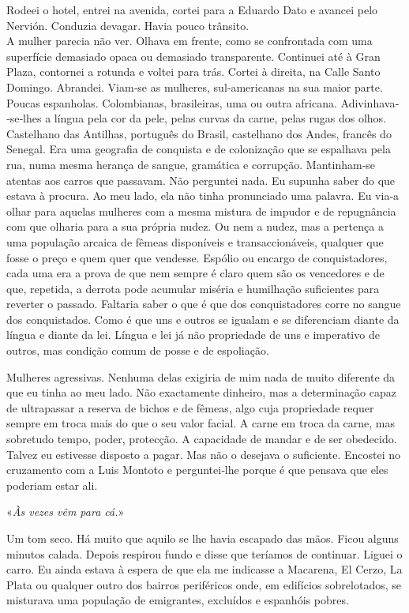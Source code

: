 Rodeei o hotel, entrei na avenida, cortei para a Eduardo Dato e avancei
pelo Nervión. Conduzia devagar. Havia pouco trânsito.\\
A mulher parecia não ver. Olhava em frente, como se confrontada com uma
superfície demasiado opaca ou demasiado transparente. Continuei até à
Gran Plaza, contornei a rotunda e voltei para trás. Cortei à direita, na
Calle Santo Domingo. Abrandei. Viam­‑se as mulheres, sul­‑americanas na
sua maior parte. Poucas espanholas. Colombianas, brasileiras, uma ou
outra africana. Adivinhava­‑se­‑lhes a língua pela cor da pele, pelas
curvas da carne, pelas rugas dos olhos. Castelhano das Antilhas,
português do Brasil, castelhano dos Andes, francês do Senegal. Era uma
geografia de conquista e de colonização que se espalhava pela rua, numa
mesma herança de sangue, gramática e corrupção. Mantinham­‑se atentas
aos carros que passavam. Não perguntei nada. Eu supunha saber do que
estava à procura. Ao meu lado, ela não tinha pronunciado uma palavra. Eu
via­‑a olhar para aquelas mulheres com a mesma mistura de impudor e de
repugnância com que olharia para a sua própria nudez. Ou nem a nudez,
mas a pertença a uma população arcaica de fêmeas disponíveis e
transaccionáveis, qualquer que fosse o preço e quem quer que vendesse.
Espólio ou encargo de conquistadores, cada uma era a prova de que nem
sempre é claro quem são os vencedores e de que, repetida, a derrota pode
acumular miséria e humilhação suficientes para reverter o passado.
Faltaria saber o que é que dos conquistadores corre no sangue dos
conquistados. Como é que uns e outros se igualam e se diferenciam diante
da língua e diante da lei. Língua e lei já não propriedade de uns e
imperativo de outros, mas condição comum de posse e de espoliação.

Mulheres agressivas. Nenhuma delas exigiria de mim nada de muito
diferente da que eu tinha ao meu lado. Não exactamente dinheiro, mas a
determinação capaz de ultrapassar a reserva de bichos e de fêmeas, algo
cuja propriedade requer sempre em troca mais do que o seu valor facial.
A carne em troca da carne, mas sobretudo tempo, poder, protecção. A
capacidade de mandar e de ser obedecido. Talvez eu estivesse disposto a
pagar. Mas não o desejava o suficiente. Encostei no cruzamento com a
Luis Montoto e perguntei­‑lhe porque é que pensava que eles poderiam
estar ali.

«\emph{Às vezes vêm para cá.}»

Um tom seco. Há muito que aquilo se lhe havia escapado das mãos. Ficou
alguns minutos calada. Depois respirou fundo e disse que teríamos de
continuar. Liguei o carro. Eu ainda estava à espera de que ela me
indicasse a Macarena, El Cerzo, La Plata ou qualquer outro dos bairros
periféricos onde, em edifícios sobrelotados, se misturava uma população
de emigrantes, excluídos e espanhóis pobres.

